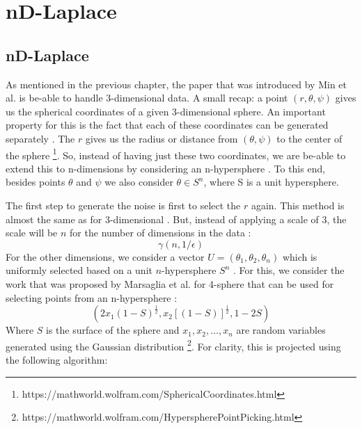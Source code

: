\chapter{nD-Laplace}




\section{nD-Laplace}
As mentioned in the previous chapter, the paper that was introduced by Min et al. is be-able to handle 3-dimensional data.
A small recap: a point $(r, \theta, \psi)$ gives us the spherical coordinates of a given 3-dimensional sphere.
An important property for this is the fact that each of these coordinates can be generated separately \citep{DBLP:journals/corr/abs-1212-1984, 9646489}.
The $r$ gives us the radius or distance from $(\theta, \psi)$ to the center of the sphere \footnote{https://mathworld.wolfram.com/SphericalCoordinates.html}.
So, instead of having just these two coordinates, we are be-able to extend this to n-dimensions by considering an n-hypersphere \citep{fernandes_generalised_2019, 9646489}.
To this end, besides points $\theta$ and $\psi$ we also consider $\theta \in S^n$, where S is a unit hypersphere.

The first step to generate the noise is first to select the $r$ again.
This method is almost the same as for 3-dimensional .
But, instead of applying a scale of 3, the scale will be $n$ for the number of dimensions in the data \citep{fernandes_generalised_2019}:
\begin{equation}
  \gamma(n, 1/\epsilon)
\end{equation}
For the other dimensions, we consider a vector $U = (\theta_1, \theta_2, \theta_n)$ which is uniformly selected based on a unit $n$-hypersphere $S^n$ \citep{fernandes_generalised_2019}.
For this, we consider the work that was proposed by Marsaglia et al. for 4-sphere that can be used for selecting points from an n-hypersphere \citep{marsaglia_choosing_1972}:
\begin{equation}
  (2x_1 (1 - S)^{\frac{1}{2}}, x_2[(1 - S)]^{\frac{1}{2}}, 1 - 2S)
\end{equation}
Where $S$ is the surface of the sphere and $x_1, x_2, …, x_n$ are random variables generated using the Gaussian distribution \footnote{https://mathworld.wolfram.com/HyperspherePointPicking.html}.
For clarity, this is projected using the following algorithm:
